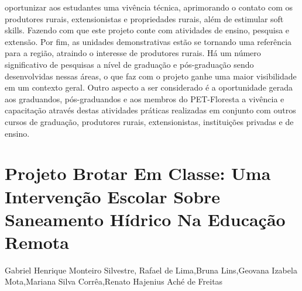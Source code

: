 oportunizar aos estudantes uma vivência técnica, aprimorando o contato com os produtores
rurais, extensionistas e propriedades rurais, além de estimular soft skills. Fazendo com que este
projeto conte com atividades de ensino, pesquisa e extensão. Por fim, as unidades demonstrativas
estão se tornando uma referência para a região, atraindo o interesse de produtores rurais. Há um
número significativo de pesquisas a nível de graduação e pós-graduação sendo desenvolvidas
nessas áreas, o que faz com o projeto ganhe uma maior visibilidade em um contexto geral. Outro
aspecto a ser considerado é a oportunidade gerada aos graduandos, pós-graduandos e aos
membros do PET-Floresta a vivência e capacitação através destas atividades práticas realizadas
em conjunto com outros cursos de graduação, produtores rurais, extensionistas, instituições
privadas e de ensino.




\section*{Projeto Brotar Em Classe: Uma Intervenção Escolar Sobre Saneamento Hídrico Na Educação Remota   }

Gabriel Henrique Monteiro Silvestre, Rafael de Lima,Bruna Lins,Geovana Izabela Mota,Mariana Silva Corrêa,Renato  Hajenius Aché de Freitas


